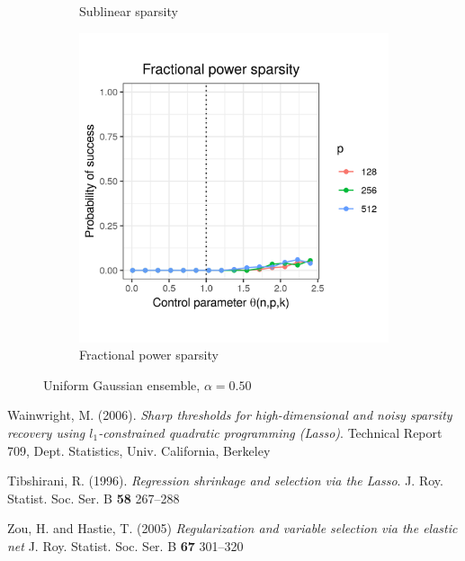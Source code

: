\documentclass[letterpaper,12pt]{article}
\begin{document}
\begin{figure}[h]
\begin{subfigure}{0.32\textwidth}
    \caption{Sublinear sparsity}
    \label{fig:uniform_sublinear_sparsity_alpha_1}
  \end{subfigure}
  \begin{subfigure}{0.32\textwidth}
    \includegraphics[width=0.9\linewidth]{uniform_fractional_power_sparsity_alpha_050}
    \caption{Fractional power sparsity}
    \label{fig:uniform_fractional_power_sparsity_alpha_1}
  \end{subfigure}
  \caption{Uniform Gaussian ensemble, $\alpha = 0.50$}
  \label{fig:uniform_alpha_050}
\end{figure}

\begin{thebibliography}{9}
  Wainwright, M. (2006).
  \textit{Sharp thresholds for high-dimensional and noisy sparsity
    recovery using $l_1$-constrained quadratic programming (Lasso)}.
  Technical Report 709, Dept. Statistics, Univ. California,
  Berkeley

  Tibshirani, R. (1996).
  \textit{Regression shrinkage and selection via the Lasso}.
  J. Roy. Statist. Soc. Ser. B \textbf{58} 267--288

  Zou, H. and Hastie, T. (2005)
  \textit{Regularization and variable selection via the elastic net}
  J. Roy. Statist. Soc. Ser. B \textbf{67} 301--320

\end{thebibliography}
\end{document}
